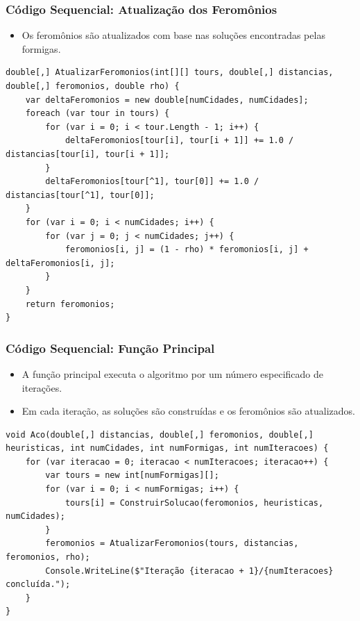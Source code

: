 \documentclass{beamer}
\begin{document}
\begin{frame}
\frametitle{Código Sequencial: Atualização dos Feromônios}
\begin{itemize}
    \item Os feromônios são atualizados com base nas soluções encontradas pelas formigas.
\end{itemize}
\begin{lstlisting}
double[,] AtualizarFeromonios(int[][] tours, double[,] distancias, double[,] feromonios, double rho) {
    var deltaFeromonios = new double[numCidades, numCidades];
    foreach (var tour in tours) {
        for (var i = 0; i < tour.Length - 1; i++) {
            deltaFeromonios[tour[i], tour[i + 1]] += 1.0 / distancias[tour[i], tour[i + 1]];
        }
        deltaFeromonios[tour[^1], tour[0]] += 1.0 / distancias[tour[^1], tour[0]];
    }
    for (var i = 0; i < numCidades; i++) {
        for (var j = 0; j < numCidades; j++) {
            feromonios[i, j] = (1 - rho) * feromonios[i, j] + deltaFeromonios[i, j];
        }
    }
    return feromonios;
}
\end{lstlisting}
\end{frame}

\begin{frame}
\frametitle{Código Sequencial: Função Principal}
\begin{itemize}
    \item A função principal executa o algoritmo por um número especificado de iterações.
    \item Em cada iteração, as soluções são construídas e os feromônios são atualizados.
\end{itemize}
\begin{lstlisting}
void Aco(double[,] distancias, double[,] feromonios, double[,] heuristicas, int numCidades, int numFormigas, int numIteracoes) {
    for (var iteracao = 0; iteracao < numIteracoes; iteracao++) {
        var tours = new int[numFormigas][];
        for (var i = 0; i < numFormigas; i++) {
            tours[i] = ConstruirSolucao(feromonios, heuristicas, numCidades);
        }
        feromonios = AtualizarFeromonios(tours, distancias, feromonios, rho);
        Console.WriteLine($"Iteração {iteracao + 1}/{numIteracoes} concluída.");
    }
}
\end{lstlisting}
\end{frame}
\end{document}
